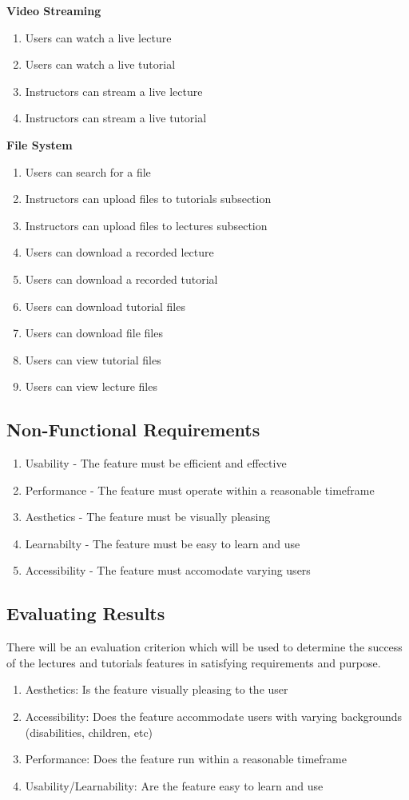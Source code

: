 \textbf{Video Streaming}
    \begin{enumerate}
    \item Users can watch a live lecture
    \item Users can watch a live tutorial
    \item Instructors can stream a live lecture
    \item Instructors can stream a live tutorial
    \end{enumerate}

\textbf{File System}
    \begin{enumerate}
    \item Users can search for a file
    \item Instructors can upload files to tutorials subsection
    \item Instructors can upload files to lectures subsection
    \item Users can download a recorded lecture
    \item Users can download a recorded tutorial
    \item Users can download tutorial files
    \item Users can download file files
    \item Users can view tutorial files
    \item Users can view lecture files
    \end{enumerate}

\subsection{Non-Functional Requirements}
  \begin{enumerate}
    \item Usability - The feature must be efficient and effective
    \item Performance - The feature must operate within a reasonable timeframe
    \item Aesthetics - The feature must be visually pleasing
    \item Learnabilty - The feature must be easy to learn and use
    \item Accessibility - The feature must accomodate varying users
    \end{enumerate}

\subsection{Evaluating Results}
There will be an evaluation criterion which will be used to determine the success of the lectures and tutorials features in satisfying requirements and purpose.

\begin{enumerate}
    \item Aesthetics: Is the feature visually pleasing to the user
    \item Accessibility: Does the feature accommodate users with varying backgrounds (disabilities, children, etc)
    \item Performance: Does the feature run within a reasonable timeframe
    \item Usability/Learnability: Are the feature easy to learn and use
\end{enumerate}